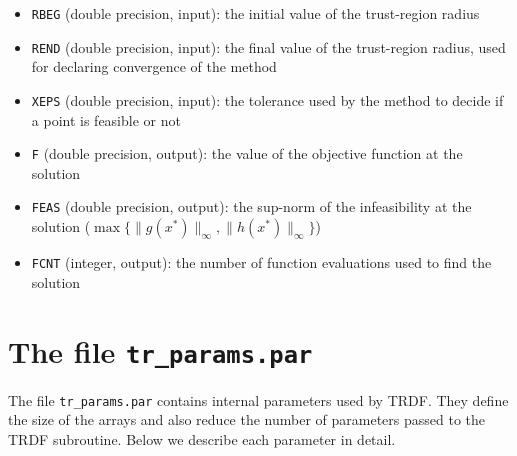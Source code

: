 \documentclass[12pt]{article}
\begin{document}
\begin{itemize}
\item \texttt{RBEG} (double precision, input): the initial value of the
  trust-region radius
\item \texttt{REND} (double precision, input): the final value of the
  trust-region radius, used for declaring convergence of the method
\item \texttt{XEPS} (double precision, input): the tolerance used by
  the method to decide if a point is feasible or not
\item \texttt{F} (double precision, output): the value of the
  objective function at the solution
\item \texttt{FEAS} (double precision, output): the sup-norm of the
  infeasibility at the solution ($\max\{\|g(x^*)\|_\infty,
  \|h(x^*)\|_\infty\}$)
\item \texttt{FCNT} (integer, output): the number of function
  evaluations used to find the solution
\end{itemize}

\section{The file \texttt{tr\_params.par}}
\label{params}

The file \texttt{tr\_params.par} contains internal parameters used by
TRDF. They define the size of the arrays and also reduce the number of
parameters passed to the TRDF subroutine. Below we describe each
parameter in detail.
\end{document}
